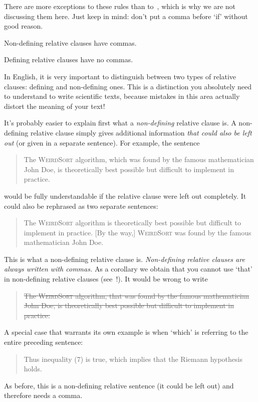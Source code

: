 There are more exceptions to these rules than to~, which is why we are not
discussing them here. Just keep in mind: don't put a comma before `if'
without good reason.

\begin{Rule}
  \label{rule:non-defining-has-comma}
  Non-defining relative clauses have commas.
\end{Rule}
\begin{Rule}
  \label{rule:defining-without-comma}
  Defining relative clauses have no commas.
\end{Rule}

In English, it is very important to distinguish between two types of
relative clauses: defining and non-defining ones. This is a
distinction you absolutely need to understand to write scientific
texts, because mistakes in this area actually distort the meaning of
your text!

It's probably easier to explain first what a \emph{non-defining}
relative clause is. A non-defining relative clause simply gives
additional information \emph{that could also be left out} (or given in
a separate sentence). For example, the sentence
\begin{quote}
  The \textsc{WeirdSort} algorithm, which was found by the famous
  mathematician John Doe, is theoretically best possible but difficult
  to implement in practice.
\end{quote}
would be fully understandable if the relative clause were left out
completely. It could also be rephrased as two separate sentences:
\begin{quote}
  The \textsc{WeirdSort} algorithm is theoretically best possible but
  difficult to implement in practice. [By the way,] \textsc{WeirdSort}
  was found by the famous mathematician John Doe.
\end{quote}
This is what a non-defining relative clause is. \emph{Non-defining
  relative clauses are always written with commas.} As a corollary we
obtain that you cannot use `that' in non-defining relative clauses
(see~!). It would be wrong to
write
\begin{quote}
  \st{The \textsc{WeirdSort} algorithm, that was found by the famous
    mathematician John Doe, is theoretically best possible but
    difficult to implement in practice.}
\end{quote}
A special case that warrants its own example is when `which' is
referring to the entire preceding sentence:
\begin{quote}
  Thus inequality (7) is true, which implies that the Riemann
  hypothesis holds.
\end{quote}
As before, this is a non-defining relative sentence (it could be left
out) and therefore needs a comma.

